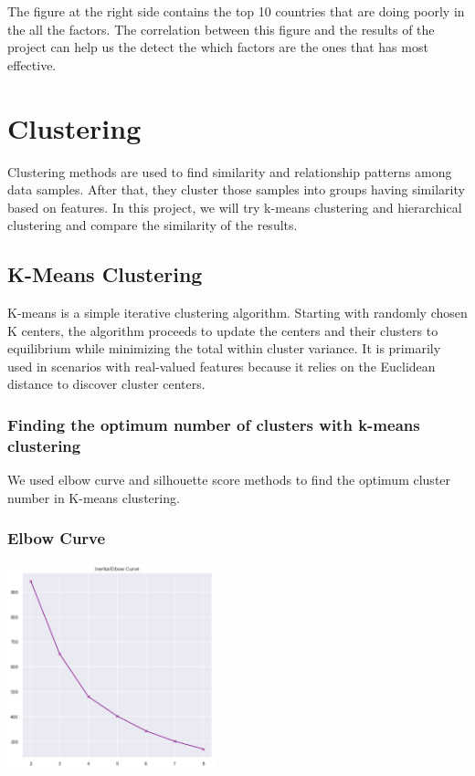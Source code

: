 \documentclass[onecolumn]{article}
\begin{document}
The figure at the right side contains the top 10 countries that are doing poorly in the all the factors. The correlation between this figure and the results of the project can help us the detect the which factors are the ones that has most effective.

\normalsize
\section{Clustering}

Clustering methods are used to find similarity and relationship patterns among data samples. After that, they cluster those samples into groups having similarity based on features. In this project, we will try k-means clustering and hierarchical clustering and compare the similarity of the results. 

\subsection{K-Means Clustering}

K-means is a simple iterative clustering algorithm. Starting with randomly chosen K centers, the algorithm proceeds to update the centers and their clusters to equilibrium while minimizing the total within cluster variance. It is primarily used in scenarios with real-valued features because it relies on the Euclidean distance to discover cluster centers.

\subsubsection{Finding the optimum number of clusters with k-means clustering}

We used elbow curve and silhouette score methods to find the optimum cluster number in K-means clustering.

\subsubsection{Elbow Curve}

\begin{center}
    \includegraphics[width=0.45\textwidth]{elbowcurve.png}
\end{center}
\end{document}

